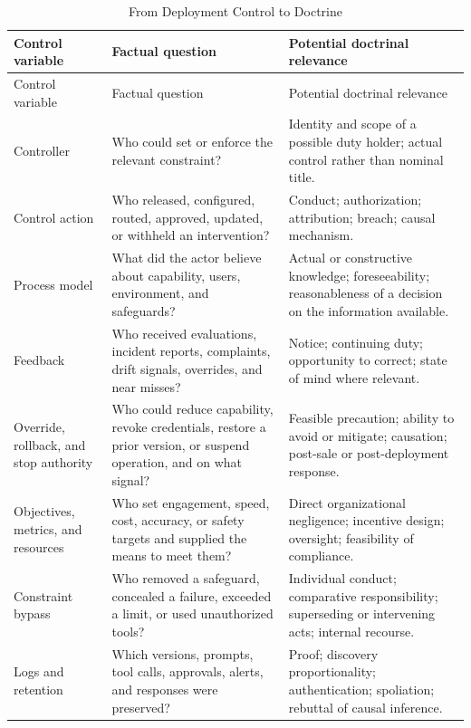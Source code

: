 \begin{longtable}{>{\raggedright\arraybackslash}p{} >{\raggedright\arraybackslash}p{} >{\raggedright\arraybackslash}p{}}
\caption{From Deployment Control to Doctrine}\label{tab:engineering-law}\\
\toprule
Control variable & Factual question & Potential doctrinal relevance \\
\midrule
\endfirsthead
\toprule
Control variable & Factual question & Potential doctrinal relevance \\
\midrule
\endhead
Controller & Who could set or enforce the relevant constraint? & Identity and scope of a possible duty holder; actual control rather than nominal title. \\
Control action & Who released, configured, routed, approved, updated, or withheld an intervention? & Conduct; authorization; attribution; breach; causal mechanism. \\
Process model & What did the actor believe about capability, users, environment, and safeguards? & Actual or constructive knowledge; foreseeability; reasonableness of a decision on the information available. \\
Feedback & Who received evaluations, incident reports, complaints, drift signals, overrides, and near misses? & Notice; continuing duty; opportunity to correct; state of mind where relevant. \\
Override, rollback, and stop authority & Who could reduce capability, revoke credentials, restore a prior version, or suspend operation, and on what signal? & Feasible precaution; ability to avoid or mitigate; causation; post-sale or post-deployment response. \\
Objectives, metrics, and resources & Who set engagement, speed, cost, accuracy, or safety targets and supplied the means to meet them? & Direct organizational negligence; incentive design; oversight; feasibility of compliance. \\
Constraint bypass & Who removed a safeguard, concealed a failure, exceeded a limit, or used unauthorized tools? & Individual conduct; comparative responsibility; superseding or intervening acts; internal recourse. \\
Logs and retention & Which versions, prompts, tool calls, approvals, alerts, and responses were preserved? & Proof; discovery proportionality; authentication; spoliation; rebuttal of causal inference. \\
\bottomrule
\end{longtable}

